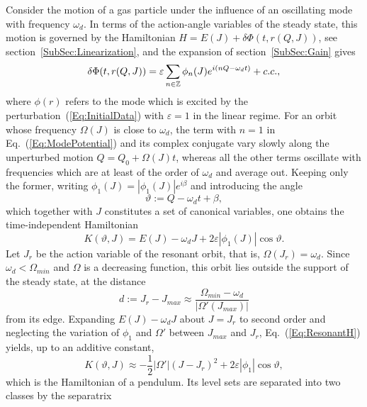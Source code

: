 Consider the motion of a gas particle under the influence of an oscillating mode with frequency $\omega_d$. In terms of the action-angle variables of the steady state, this motion is governed by the Hamiltonian $H = E(J) + \delta\Phi(t,r(Q,J))$, see section~\ref{SubSec:Linearization}, and the expansion of section~\ref{SubSec:Gain} gives
\begin{equation}
\delta\Phi(t,r(Q,J)) = \varepsilon\sum\limits_{n\in\mathbb{Z}} \phi_n(J) e^{i(nQ - \omega_d t)} + c.c.,
\label{Eq:ModePotential}
\end{equation}
where $\phi(r)$ refers to the mode which is excited by the perturbation~(\ref{Eq:InitialData}) with $\varepsilon = 1$ in the linear regime. For an orbit whose frequency $\Omega(J)$ is close to $\omega_d$, the term with $n = 1$ in Eq.~(\ref{Eq:ModePotential}) and its complex conjugate vary slowly along the unperturbed motion $Q = Q_0 + \Omega(J)t$, whereas all the other terms oscillate with frequencies which are at least of the order of $\omega_d$ and average out. Keeping only the former, writing $\phi_1(J) = |\phi_1(J)| e^{i\beta}$ and introducing the angle
\begin{equation}
\vartheta := Q - \omega_d t + \beta,
\label{Eq:thetaDef}
\end{equation}
which together with $J$ constitutes a set of canonical variables, one obtains the time-independent Hamiltonian
\begin{equation}
K(\vartheta,J) = E(J) - \omega_d J + 2\varepsilon |\phi_1(J)|\cos\vartheta.
\label{Eq:ResonantH}
\end{equation}
Let $J_r$ be the action variable of the resonant orbit, that is, $\Omega(J_r) = \omega_d$. Since $\omega_d < \Omega_{min}$ and $\Omega$ is a decreasing function, this orbit lies outside the support of the steady state, at the distance
\begin{equation}
d := J_r - J_{max}\approx \frac{\Omega_{min} - \omega_d}{|\Omega'(J_{max})|}
\label{Eq:dDef}
\end{equation}
from its edge. Expanding $E(J) - \omega_d J$ about $J = J_r$ to second order and neglecting the variation of $\phi_1$ and $\Omega'$ between $J_{max}$ and $J_r$, Eq.~(\ref{Eq:ResonantH}) yields, up to an additive constant,
\begin{equation}
K(\vartheta,J)\approx -\frac{1}{2}|\Omega'|(J - J_r)^2 + 2\varepsilon |\phi_1|\cos\vartheta,
\label{Eq:Pendulum}
\end{equation}
which is the Hamiltonian of a pendulum. Its level sets are separated into two classes by the separatrix
